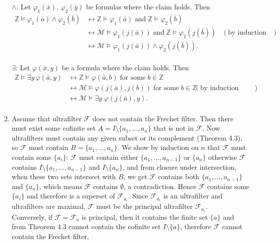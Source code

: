 \documentclass{article}
\begin{document}
\begin{enumerate}
    $\wedge$: Let $\varphi_1(\bar{x})$, $\varphi_2(\bar{y})$ be formulas
    where the claim holds. Then
    \begin{align*}
      \mathbb{Z}\models\varphi_1(\bar{a})\wedge\varphi_2(\bar{b})
        &\leftrightarrow\mathbb{Z}\models\varphi_1(\bar{a})\;\text{and}\;
        \mathbb{Z}\models\varphi_2(\bar{b})& \\
        &\leftrightarrow\mathcal{M}\models\varphi_1(j(\bar{a}))\;\text{and}\;
        \mathbb{Z}\models\varphi_2(j(\bar{b}))& (\text{by induction
        hypothesis}) \\
        &\leftrightarrow\mathcal{M}\models\varphi_1(j(\bar{a}))\wedge\varphi_2(j(\bar{b})). & \\
    \end{align*}

    $\exists$: Let $\varphi(\bar{x},y)$ be a formula where the claim holds.
    Then
    \begin{align*}
      \mathbb{Z}\models\exists y\, \varphi(\bar{a},y)
        &\leftrightarrow\mathbb{Z}\models\varphi(\bar{a},b)\; \text{for
        some}\; b\in\mathbb{Z} & \\
        &\leftrightarrow\mathcal{M}\models\varphi(j(\bar{a}),j(b))\;
        \text{for some}\; b\in\mathbb{Z}& (\text{by induction hypothesis})
        \\
        &\leftrightarrow\mathcal{M}\models\exists y\; \varphi(j(\bar{a}),y). & \\
    \end{align*}

  \item Assume that ultrafilter $\mathcal{F}$ does not contain the Frechet
    filter. Then there must exist some cofinite set
    $A=I\setminus\{a_1,\ldots,a_n\}$ that is not in $\mathcal{F}$. Now
    ultrafilters must contain any given subset or its complement (Theorem
    4.3), so $\mathcal{F}$ must contain $B=\{a_1,\ldots,a_n\}$. We show by
    induction on $n$ that $\mathcal{F}$ must contain some $\{a_i\}$:
    $\mathcal{F}$ must contain either $\{a_1,\ldots,a_{n-1}\}$ or $\{a_n\}$
    otherwise $\mathcal{F}$ contains $I\setminus\{a_1,\ldots,a_{n-1}\}$ and
    $I\setminus\{a_n\}$, and from closure under intersection, when these
    two sets intersect with $B$, we get $\mathcal{F}$ contains both
    $\{a_1,\ldots,a_{n-1}\}$ and $\{a_n\}$, which means $\mathcal{F}$
    contains $\emptyset$, a contradiction. Hence $\mathcal{F}$ contains
    some $\{a_i\}$ and therefore is a superset of $\mathcal{F}_{a_i}$.
    Since $\mathcal{F}_{a_i}$ is an ultrafilter and ultrafilters are
    maximal, $\mathcal{F}$ must be the principal ultrafilter
    $\mathcal{F}_{a_i}$. \\

    Conversely, if $\mathcal{F}=\mathcal{F}_a$ is principal, then it
    contains the finite set $\{a\}$ and from Theorem 4.3 cannot contain the
    cofinite set $I\setminus\{a\}$, therefore $\mathcal{F}$ cannot contain
    the Frechet filter.
\end{enumerate}
\end{document}
